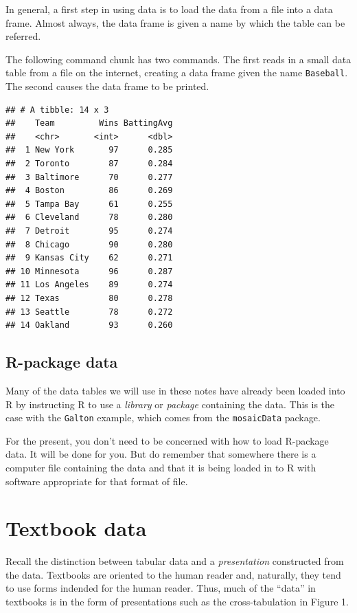 \documentclass[]{book}
\theoremstyle{definition}
\theoremstyle{definition}
\theoremstyle{definition}
\theoremstyle{remark}
\begin{document}
In general, a first step in using data is to load the data from a file
into a data frame. Almost always, the data frame is given a name by
which the table can be referred.

The following command chunk has two commands. The first reads in a small
data table from a file on the internet, creating a data frame given the
name \texttt{Baseball}. The second causes the data frame to be printed.

\begin{verbatim}
## # A tibble: 14 x 3
##    Team         Wins BattingAvg
##    <chr>       <int>      <dbl>
##  1 New York       97      0.285
##  2 Toronto        87      0.284
##  3 Baltimore      70      0.277
##  4 Boston         86      0.269
##  5 Tampa Bay      61      0.255
##  6 Cleveland      78      0.280
##  7 Detroit        95      0.274
##  8 Chicago        90      0.280
##  9 Kansas City    62      0.271
## 10 Minnesota      96      0.287
## 11 Los Angeles    89      0.274
## 12 Texas          80      0.278
## 13 Seattle        78      0.272
## 14 Oakland        93      0.260
\end{verbatim}

\subsection{R-package data}\label{r-package-data}

Many of the data tables we will use in these notes have already been
loaded into R by instructing R to use a \emph{library} or \emph{package}
containing the data. This is the case with the \texttt{Galton} example,
which comes from the \texttt{mosaicData} package.

For the present, you don't need to be concerned with how to load
R-package data. It will be done for you. But do remember that somewhere
there is a computer file containing the data and that it is being loaded
in to R with software appropriate for that format of file.

\section{Textbook data}\label{textbook-data}

Recall the distinction between tabular data and a \emph{presentation}
constructed from the data. Textbooks are oriented to the human reader
and, naturally, they tend to use forms indended for the human reader.
Thus, much of the ``data'' in textbooks is in the form of presentations
such as the cross-tabulation in Figure 1.
\end{document}
